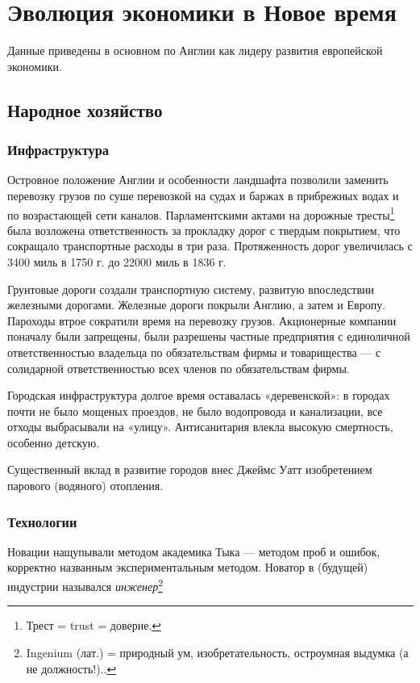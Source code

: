 %
%
\section[Эволюция экономики в Новое время]{Эволюция экономики в Новое время}
Данные приведены в основном по Англии как лидеру развития европейской экономики.

\subsection[Народное хозяйство]{Народное хозяйство}
\subsubsection[Инфраструктура]{Инфраструктура}
Островное положение Англии и особенности ландшафта позволили заменить перевозку грузов по суше перевозкой на судах и
баржах в прибрежных водах и по возрастающей сети каналов. Парламентскими актами на дорожные
тресты\footnote{Трест = trust = доверие.} была возложена ответственность за прокладку дорог с твердым
покрытием, что сокращало транспортные расходы в три раза. Протяженность дорог увеличилась с 3400 миль в 1750 г. до
22000 миль в 1836 г.

Грунтовые дороги создали транспортную систему, развитую впоследствии железными дорогами. Железные дороги покрыли Англию,
а затем и Европу. Пароходы втрое сократили время на перевозку грузов.
Акционерные компании поначалу были запрещены, были разрешены частные предприятия с единоличной ответственностью
владельца по обязательствам фирмы и товарищества — с солидарной ответственностью всех членов по обязательствам фирмы.

Городская инфраструктура долгое время оставалась «деревенской»: в городах почти не было мощеных проездов, не было
водопровода и канализации, все отходы выбрасывали на «улицу». Антисанитария влекла высокую смертность, особенно
детскую.


Существенный вклад в развитие городов внес Джеймс Уатт изобретением парового (водяного) отопления.

\subsubsection[Технологии]{Технологии}
Новации нащупывали методом академика Тыка — методом проб и ошибок, корректно названным экспериментальным методом.
Новатор в (будущей) индустрии назывался \textit{инженер}\footnote{\foreignlanguage{english}{Ingenium}
(лат.) = природный ум, изобретательность, остроумная выдумка (а не должность!)..}


